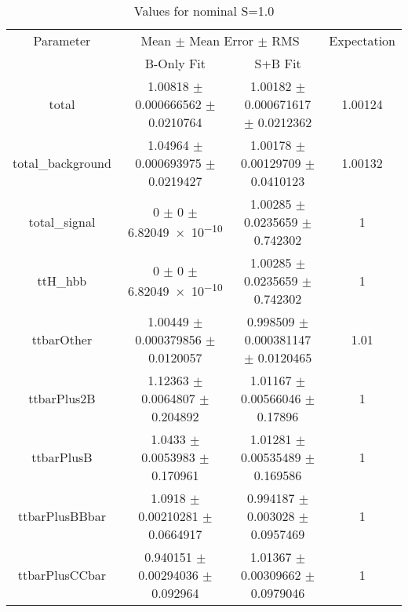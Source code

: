 \begin{table}
\centering
\caption{Values for nominal S=1.0}
\begin{tabular}{cccc}
\toprule
Parameter & \multicolumn{2}{c}{Mean $\pm$ Mean Error $\pm$ RMS} & Expectation\\
 & B-Only Fit & S+B Fit & \\
\midrule
total & \num{1.00818} $\pm$ \num{0.000666562} $\pm$ \num{0.0210764} & \num{1.00182} $\pm$ \num{0.000671617} $\pm$ \num{0.0212362} & \num{1.00124}\\
total\_background & \num{1.04964} $\pm$ \num{0.000693975} $\pm$ \num{0.0219427} & \num{1.00178} $\pm$ \num{0.00129709} $\pm$ \num{0.0410123} & \num{1.00132}\\
total\_signal & \num{0} $\pm$ \num{0} $\pm$ \num{6.82049e-10} & \num{1.00285} $\pm$ \num{0.0235659} $\pm$ \num{0.742302} & \num{1}\\
ttH\_hbb & \num{0} $\pm$ \num{0} $\pm$ \num{6.82049e-10} & \num{1.00285} $\pm$ \num{0.0235659} $\pm$ \num{0.742302} & \num{1}\\
ttbarOther & \num{1.00449} $\pm$ \num{0.000379856} $\pm$ \num{0.0120057} & \num{0.998509} $\pm$ \num{0.000381147} $\pm$ \num{0.0120465} & \num{1.01}\\
ttbarPlus2B & \num{1.12363} $\pm$ \num{0.0064807} $\pm$ \num{0.204892} & \num{1.01167} $\pm$ \num{0.00566046} $\pm$ \num{0.17896} & \num{1}\\
ttbarPlusB & \num{1.0433} $\pm$ \num{0.0053983} $\pm$ \num{0.170961} & \num{1.01281} $\pm$ \num{0.00535489} $\pm$ \num{0.169586} & \num{1}\\
ttbarPlusBBbar & \num{1.0918} $\pm$ \num{0.00210281} $\pm$ \num{0.0664917} & \num{0.994187} $\pm$ \num{0.003028} $\pm$ \num{0.0957469} & \num{1}\\
ttbarPlusCCbar & \num{0.940151} $\pm$ \num{0.00294036} $\pm$ \num{0.092964} & \num{1.01367} $\pm$ \num{0.00309662} $\pm$ \num{0.0979046} & \num{1}\\
\bottomrule
\end{tabular}
\end{table}